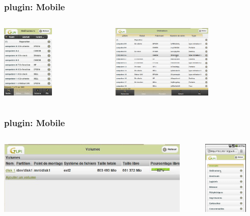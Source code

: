 \documentclass{beamer}
\begin{document}
\begin{frame}
    \frametitle{plugin: Mobile}

 \begin{columns}
\begin{column}{0.5\textwidth}
   \includegraphics[height=3.5cm]{./pics/mobile/computers.jpg}
 \end{column}

 \begin{column}{0.5\textwidth}
   \includegraphics[height=3.5cm]{./pics/mobile/computers_tablet.jpg}
 \end{column}
\end{columns}

\end{frame}

\begin{frame}
    \frametitle{plugin: Mobile}

 \begin{columns}
 \begin{column}{0.5\textwidth}
 \includegraphics[height=3.5cm]{./pics/mobile/volumes_detail_tablet.jpg}
 \end{column}
 \begin{column}{0.5\textwidth}
   \includegraphics[height=3.5cm]{./pics/mobile/inventory.jpg}
 \end{column}
\end{columns}

\end{frame}
\end{document}
